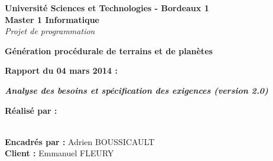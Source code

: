 \documentclass [a4paper,11pt,utf8]{report}
\begin{document}
\begin{titlepage}
\begin{center}
{\bf Université Sciences et Technologies - Bordeaux 1} \vspace{0.5cm}\\

{\bf {\large Master 1 Informatique}}\\
{ \emph{Projet de programmation}}\\\vspace{5cm}



{\huge{\bf Génération procédurale de terrains et de planètes}}\\\vspace{1cm}

{\large{\bf{Rapport du 04 mars 2014 :}}}\vspace{1cm}

{\large\bf\it\rm Analyse des besoins et spécification des exigences (version 2.0)
}\vspace{2cm}


\end{center}


\hspace{1cm}\textbf{Réalisé par :}

\hspace{1cm}{Simon CAULE}

\hspace{1cm}{Pierre HUCHANT}

\hspace{1cm}{Solène JOLLY}

\hspace{1cm}{Adrien LAMOUREUX}\\


\hspace{1cm}\textbf{Encadrés par :} Adrien BOUSSICAULT\\

\hspace{1cm}\textbf{Client :} Emmanuel FLEURY\\

\end{titlepage}

\tableofcontents




%
\end{document}
